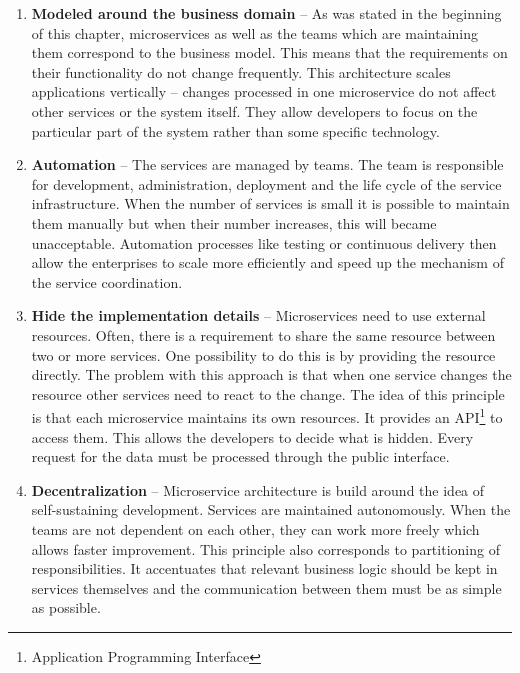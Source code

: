 \documentclass[oneside,
  digital, %
  table,   %
  nolof,     %
  nolot,     %
]{fithesis3}
\begin{document}
\begin{enumerate}
	
	\item \textbf{Modeled around the business domain} -- As was stated in the beginning of this chapter, microservices as well as the teams which are maintaining them correspond to the business model. This means that the requirements on their functionality do not change frequently. This architecture scales applications vertically -- changes processed in one microservice do not affect other services or the system itself. They allow developers to focus on the particular part of the system rather than some specific technology. 
	
	\item \textbf{Automation} -- The services are managed by teams. The team is responsible for development, administration, deployment and the life cycle of the service infrastructure. When the number of services is small it is possible to maintain them manually but when their number increases, this will became unacceptable. Automation processes like testing or continuous delivery then allow the enterprises to scale more efficiently and speed up the mechanism of the service coordination.
	
	\item \textbf{Hide the implementation details} -- Microservices need to use external resources. Often, there is a requirement to share the same resource between two or more services. One possibility to do this is by providing the resource directly. The problem with this approach is that when one service changes the resource other services need to react to the change. The idea of this principle is that each microservice maintains its own resources. It  provides an API\footnote{Application Programming Interface} to access them. This allows the developers to decide what is hidden. Every request for the data must be processed through the public interface.
	
	\item \textbf{Decentralization} -- Microservice architecture is build around the idea of self-sustaining development. Services are maintained autonomously. When the teams are not dependent on each other, they can work more freely which allows faster improvement. This principle also corresponds to partitioning of responsibilities. It accentuates that relevant business logic should be kept in services themselves and the communication between them must be as simple as possible.  
	

\end{enumerate}
\end{document}

